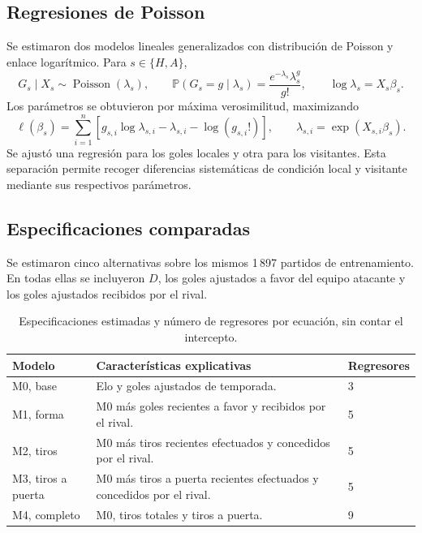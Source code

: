 \documentclass[11pt,a4paper]{article}
\newcommand{\Prob}{\mathbb{P}}
\begin{document}
\subsection{Regresiones de Poisson}
Se estimaron dos modelos lineales generalizados con distribución de Poisson y enlace logarítmico. Para $s\in\{H,A\}$,
\begin{equation}
G_s\mid X_s\sim\operatorname{Poisson}(\lambda_s),\qquad
\Prob(G_s=g\mid\lambda_s)=\frac{e^{-\lambda_s}\lambda_s^g}{g!},\qquad
\log\lambda_s=X_s\beta_s.
\label{eq:poisson}
\end{equation}
Los parámetros se obtuvieron por máxima verosimilitud, maximizando
\begin{equation}
\ell(\beta_s)=\sum_{i=1}^{n}\left[g_{s,i}\log\lambda_{s,i}-\lambda_{s,i}-\log(g_{s,i}!)\right],
\qquad \lambda_{s,i}=\exp(X_{s,i}\beta_s).
\label{eq:likelihood}
\end{equation}
Se ajustó una regresión para los goles locales y otra para los visitantes. Esta separación permite recoger diferencias sistemáticas de condición local y visitante mediante sus respectivos parámetros.

\subsection{Especificaciones comparadas}
Se estimaron cinco alternativas sobre los mismos 1\,897 partidos de entrenamiento. En todas ellas se incluyeron $D$, los goles ajustados a favor del equipo atacante y los goles ajustados recibidos por el rival.

\begin{table}[H]
\centering\small
\caption{Especificaciones estimadas y número de regresores por ecuación, sin contar el intercepto.}
\begin{tabularx}{\textwidth}{p{}Xp{}}
\toprule
Modelo & Características explicativas & Regresores\\
\midrule
M0, base & Elo y goles ajustados de temporada. & 3\\
M1, forma & M0 más goles recientes a favor y recibidos por el rival. & 5\\
M2, tiros & M0 más tiros recientes efectuados y concedidos por el rival. & 5\\
M3, tiros a puerta & M0 más tiros a puerta recientes efectuados y concedidos por el rival. & 5\\
M4, completo & M0, tiros totales y tiros a puerta. & 9\\
\bottomrule
\end{tabularx}
\end{table}
\end{document}

